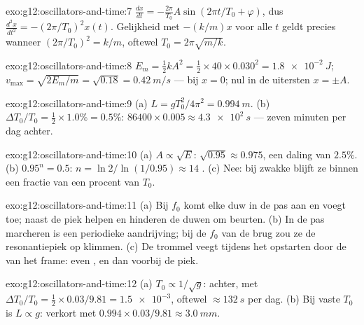 \begin{solution}{exo:g12:oscillators-and-time:7}
$\frac{dx}{dt} = -\frac{2\pi}{T_0}A\sin(2\pi t/T_0 + \varphi)$, dus
$\frac{d^2x}{dt^2} = -(2\pi/T_0)^2 x(t)$. Gelijkheid met $-(k/m)x$ voor alle
$t$ geldt precies wanneer $(2\pi/T_0)^2 = k/m$, oftewel
$T_0 = 2\pi\sqrt{m/k}$.
\end{solution}

\begin{solution}{exo:g12:oscillators-and-time:8}
$E_m = \tfrac12 kA^2 = \tfrac12 \times 40 \times 0.030^2 =
\qty{1.8e-2}{J}$; $v_{\max} = \sqrt{2E_m/m} = \sqrt{0.18} =
\qty{0.42}{m/s}$ --- bij $x = 0$; nul in de uitersten $x = \pm A$.
\end{solution}

\begin{solution}{exo:g12:oscillators-and-time:9}
(a) $L = gT_0^2/4\pi^2 = \qty{0.994}{m}$. (b) $\Delta T_0/T_0 =
\tfrac12 \times 1.0\% = 0.5\%$: $86400 \times 0.005 \approx
\qty{4.3e2}{s}$ --- zeven minuten per dag achter.
\end{solution}

\begin{solution}{exo:g12:oscillators-and-time:10}
(a) $A \propto \sqrt{E}$: $\sqrt{0.95} \approx 0.975$, een daling van
$2.5\%$. (b) $0.95^n = 0.5$: $n = \ln 2/\ln(1/0.95) \approx 14$ .
(c) Nee: bij zwakke  blijft ze binnen een fractie van een procent van
$T_0$.
\end{solution}

\begin{solution}{exo:g12:oscillators-and-time:11}
(a) Bij $f_0$ komt elke duw in de pas aan en voegt  toe; naast de piek
helpen en hinderen de duwen om beurten. (b) In de pas marcheren is een
periodieke aandrijving; bij de $f_0$ van de brug zou ze de resonantiepiek op
klimmen. (c) De trommel veegt tijdens het opstarten door de 
van het frame: even , en dan voorbij de piek.
\end{solution}

\begin{solution}{exo:g12:oscillators-and-time:12}
(a) $T_0 \propto 1/\sqrt{g}$: achter, met $\Delta T_0/T_0 = \tfrac12
\times 0.03/9.81 = \num{1.5e-3}$, oftewel $\approx \qty{132}{s}$ per dag.
(b) Bij vaste $T_0$ is $L \propto g$: verkort met $0.994 \times
0.03/9.81 \approx \qty{3.0}{mm}$.
\end{solution}

